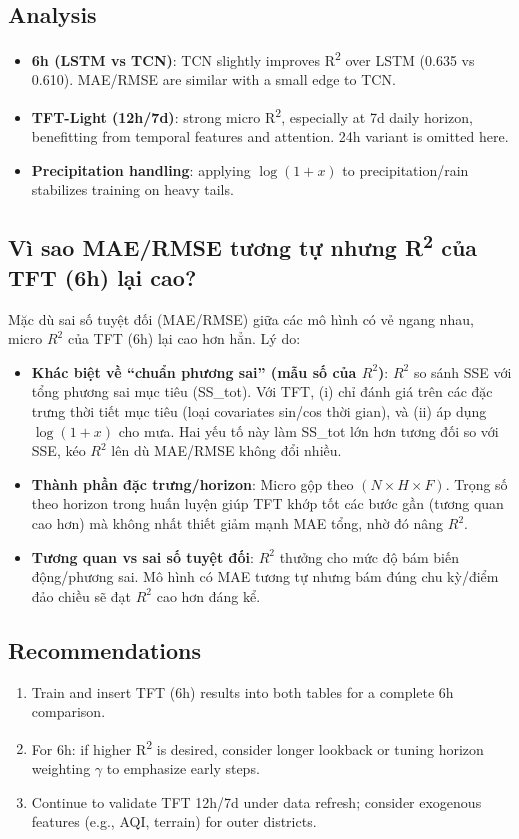\documentclass[12pt,a4paper]{article}
\begin{document}
\subsection{Analysis}
\begin{itemize}
    \item \textbf{6h (LSTM vs TCN)}: TCN slightly improves R\textsuperscript{2} over LSTM (0.635 vs 0.610). MAE/RMSE are similar with a small edge to TCN.
    \item \textbf{TFT-Light (12h/7d)}: strong micro R\textsuperscript{2}, especially at 7d daily horizon, benefitting from temporal features and attention. 24h variant is omitted here.
    \item \textbf{Precipitation handling}: applying $\log(1+x)$ to precipitation/rain stabilizes training on heavy tails.
\end{itemize}

\subsection*{Vì sao MAE/RMSE tương tự nhưng R\textsuperscript{2} của TFT (6h) lại cao?}
Mặc dù sai số tuyệt đối (MAE/RMSE) giữa các mô hình có vẻ ngang nhau, micro $R^2$ của TFT (6h) lại cao hơn hẳn. Lý do:
\begin{itemize}
    \item \textbf{Khác biệt về “chuẩn phương sai” (mẫu số của $R^2$)}: $R^2$ so sánh SSE với tổng phương sai mục tiêu (SS\_tot). Với TFT, (i) chỉ đánh giá trên các đặc trưng thời tiết mục tiêu (loại covariates sin/cos thời gian), và (ii) áp dụng $\log(1+x)$ cho mưa. Hai yếu tố này làm SS\_tot lớn hơn tương đối so với SSE, kéo $R^2$ lên dù MAE/RMSE không đổi nhiều.
    \item \textbf{Thành phần đặc trưng/horizon}: Micro gộp theo $(N\!\times\!H\!\times\!F)$. Trọng số theo horizon trong huấn luyện giúp TFT khớp tốt các bước gần (tương quan cao hơn) mà không nhất thiết giảm mạnh MAE tổng, nhờ đó nâng $R^2$.
    \item \textbf{Tương quan vs sai số tuyệt đối}: $R^2$ thưởng cho mức độ bám biến động/phương sai. Mô hình có MAE tương tự nhưng bám đúng chu kỳ/điểm đảo chiều sẽ đạt $R^2$ cao hơn đáng kể.
\end{itemize}

\subsection{Recommendations}
\begin{enumerate}
    \item Train and insert TFT (6h) results into both tables for a complete 6h comparison.
    \item For 6h: if higher R\textsuperscript{2} is desired, consider longer lookback or tuning horizon weighting $\gamma$ to emphasize early steps.
    \item Continue to validate TFT 12h/7d under data refresh; consider exogenous features (e.g., AQI, terrain) for outer districts.
\end{enumerate}
\end{document}
